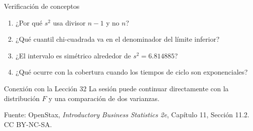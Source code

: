 \documentclass[aspectratio=169,10pt,spanish]{beamer}
\begin{document}
\begin{frame}{Verificación de conceptos}
  \begin{enumerate}
    \item ¿Por qué $s^{2}$ usa divisor $n-1$ y no $n$?
    \item ¿Qué cuantil chi-cuadrada va en el denominador del límite inferior?
    \item ¿El intervalo es simétrico alrededor de $s^{2}=6.814885$?
    \item ¿Qué ocurre con la cobertura cuando los tiempos de ciclo son
      exponenciales?
  \end{enumerate}

  \vspace{0.6em}
  \begin{block}{Conexión con la Lección 32}
    La sesión puede continuar directamente con la distribución $F$ y una
    comparación de dos varianzas.
  \end{block}

  \vfill
  \scriptsize Fuente: OpenStax, \textit{Introductory Business Statistics 2e},
  Capítulo 11, Sección 11.2. CC BY-NC-SA.
\end{frame}

\appendix
\end{document}
